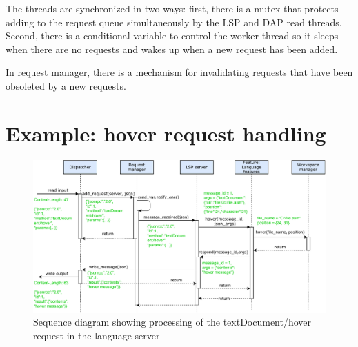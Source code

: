 The threads are synchronized in two ways: first, there is a mutex that protects adding to the request queue simultaneously by the LSP and DAP read threads. Second, there is a conditional variable to control the worker thread so it sleeps when there are no requests and wakes up when a new request has been added.

In request manager, there is a mechanism for invalidating requests that have been obsoleted by a new requests.


\section{Example: hover request handling}

\begin{landscape}
	\begin{figure}
		\centering
		\includegraphics[width=21cm]{img/hover_sequence}
		\caption{Sequence diagram showing processing of the textDocument/hover request in the language server}
		\label{lang_server_arch}
	\end{figure}
\end{landscape}
